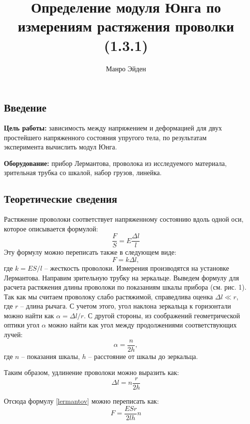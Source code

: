 \documentclass[a4paper, 12pt]{article}
\title{\textbf{Определение модуля Юнга по измерениям растяжения проволки (1.3.1)}}
\author{Манро Эйден}
\date{}
\begin{document}
\maketitle

    \begin{center}
    \section*{Введение}    
    \end{center}

    \noindent \textbf{Цель работы:} зависимость между напряжением и деформацией
    для двух простейшего напряженного состояния упругого тела,
    по результатам эксперимента вычислить модул Юнга.

    \bigskip

    \noindent \textbf{Оборудование:} прибор Лермантова, проволока
    из исследуемого материала, зрительная трубка со шкалой, набор грузов, линейка.
    
    \bigskip

\begin{center}

    \subsection*{Теоретические сведения}
    Растяжение проволоки соответствует напряженному состоянию вдоль одной оси, которое описывается формулой:
\begin{equation}
    \frac{F}{S} = E \frac{\Delta l}{l}
    \label{lermantov}
\end{equation}
    Эту формулу можно переписать также в следующем виде:
    \begin{equation}
        F = k\Delta l,
    \end{equation}
    где $k = ES / l$ -- жесткость проволоки.
    Измерения производятся на установке Лермантова.
    Направим зрительную трубку на зеркальце.
    Выведем формулу для расчета растяжения длины проволоки по показаниям шкалы
    прибора (см. рис. 1).
    Так как мы считаем проволоку слабо растяжимой, справедлива оценка $\Delta l \ll r$, где
    $r$ -- длина рычага. С учетом этого, угол наклона зеркальца к горизонтали можно
    найти как $\alpha = \Delta l/r$. С другой стороны, из соображений геометрической оптики
    угол $\alpha$ можно найти как угол между продолжениями соответствующих лучей:
    \begin{equation}
        \alpha = \frac{n}{2h},
    \end{equation}
    где $n$ -- показания шкалы, $h$ -- расстояние от шкалы до
    зеркальца.
    \par Таким образом, удлинение проволоки можно выразить как:
    \begin{equation}
        \Delta l = n\frac{r}{2h}
        \label{dlina}
    \end{equation}

    Отсюда формулу \eqref{lermantov} можно переписать как:
    \begin{equation}
        F = \frac{ESr}{2lh}n
    \end{equation}

\end{center}
\end{document}
